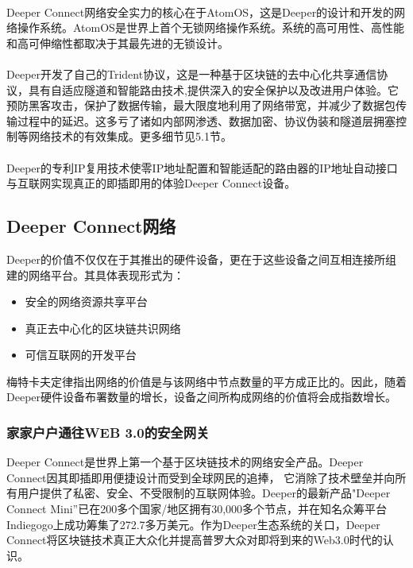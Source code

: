 \documentclass[a4paper]{article}
\begin{document}
\\
Deeper Connect网络安全实力的核心在于AtomOS，这是Deeper的设计和开发的网络操作系统。AtomOS是世界上首个无锁网络操作系统。系统的高可用性、高性能和高可伸缩性都取决于其最先进的无锁设计。\\

\\
Deeper开发了自己的Trident协议，这是一种基于区块链的去中心化共享通信协议，具有自适应隧道和智能路由技术,提供深入的安全保护以及改进用户体验。它预防黑客攻击，保护了数据传输，最大限度地利用了网络带宽，并减少了数据包传输过程中的延迟。这多亏了诸如内部网渗透、数据加密、协议伪装和隧道层拥塞控制等网络技术的有效集成。更多细节见5.1节。\\

\\
Deeper的专利IP复用技术使零IP地址配置和智能适配的路由器的IP地址自动接口与互联网实现真正的即插即用的体验Deeper Connect设备。

\subsection{Deeper Connect网络}
Deeper的价值不仅仅在于其推出的硬件设备，更在于这些设备之间互相连接所组建的网络平台。其具体表现形式为：

\begin{itemize}
\item 安全的网络资源共享平台
\item 真正去中心化的区块链共识网络
\item 可信互联网的开发平台
\end{itemize}

\noindent 梅特卡夫定律\cite{shapiro1998information}指出网络的价值是与该网络中节点数量的平方成正比的。因此，随着Deeper硬件设备布署数量的增长，设备之间所构成网络的价值将会成指数增长。

\subsubsection{家家户户通往WEB 3.0的安全网关}
Deeper Connect是世界上第一个基于区块链技术的网络安全产品。Deeper Connect因其即插即用便捷设计而受到全球网民的追捧， 它消除了技术壁垒并向所有用户提供了私密、安全、不受限制的互联网体验。Deeper的最新产品"Deeper Connect Mini”已在200多个国家/地区拥有30,000多个节点，并在知名众筹平台Indiegogo上成功筹集了272.7多万美元。作为Deeper生态系统的关口，Deeper Connect将区块链技术真正大众化并提高普罗大众对即将到来的Web3.0时代的认识。
\end{document}
